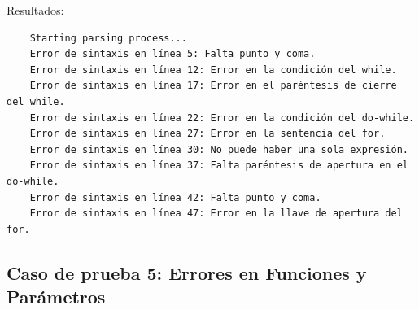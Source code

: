\documentclass[a4paper,12pt]{article}
\begin{document}
\begin{flushleft}
	Resultados:
	\begin{verbatim}
	Starting parsing process...
	Error de sintaxis en línea 5: Falta punto y coma.
	Error de sintaxis en línea 12: Error en la condición del while.
	Error de sintaxis en línea 17: Error en el paréntesis de cierre del while.
	Error de sintaxis en línea 22: Error en la condición del do-while.
	Error de sintaxis en línea 27: Error en la sentencia del for.
	Error de sintaxis en línea 30: No puede haber una sola expresión.
	Error de sintaxis en línea 37: Falta paréntesis de apertura en el do-while.
	Error de sintaxis en línea 42: Falta punto y coma.
	Error de sintaxis en línea 47: Error en la llave de apertura del for.
	\end{verbatim}
\end{flushleft}

\subsection*{Caso de prueba 5: Errores en Funciones y Parámetros}
\end{document}
